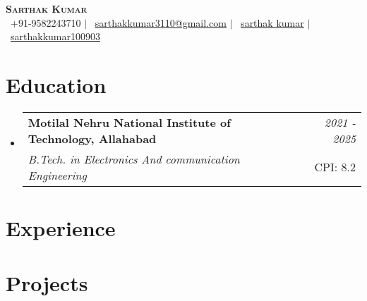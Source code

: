 \documentclass[a4paper,11pt]{article}
\makeatletter
\newcommand{\resumeSubheading}[4]{
\vspace{0mm}\item
    \begin{tabular*}{0.98\textwidth}[t]{l@{\extracolsep{\fill}}r}
        \textbf{#1} & \textit{\footnotesize{#4}} \\
        \textit{\footnotesize{#3}} &  \footnotesize{#2}\\
    \end{tabular*}
    \vspace{-2mm}
}
\newcommand{\resumeSubHeadingListStart}{\begin{itemize}[leftmargin=0ex, label={}, labelsep=0.0mm]}
\newcommand{\resumeSubHeadingListEnd}{\end{itemize}\vspace{0mm}}
\makeatother
\begin{document}
\selectfont


\begin{center}
    \textbf{\Huge \scshape Sarthak Kumar} \\ \vspace{-0.5pt}
    \small 
    \faPhone\ +91-9582243710 $|$ 
    \faEnvelope\ \href{mailto:sarthakkumar3110@gmail.com}{\underline{sarthakkumar3110@gmail.com}} $|$ 
    \faLinkedin\ \href{https://www.linkedin.com/in/sarthak-kumar311003/}{\underline{sarthak kumar}} $|$
    \faGithub\ \href{https://github.com/sarthakkumar100903}{\underline{sarthakkumar100903}}
\end{center}





\vspace{-3.0mm}
\section{\textbf{Education}}
\vspace{-0.5mm}
  \resumeSubHeadingListStart
    \resumeSubheading
      { Motilal Nehru National Institute of Technology, Allahabad}{CPI: 8.2}
      { B.Tech. in Electronics And communication Engineering}{2021 - 2025}
  \resumeSubHeadingListEnd
\vspace{-4.5mm}
\section{\textbf{Experience}}
\vspace{-0.5mm}
  
\vspace{-7.0mm}
\section{\textbf{Projects}}
\vspace{-1.0mm}
\resumeSubHeadingListStart



    \vspace{-3mm}  
  \resumeSubHeadingListEnd
\vspace{-2.55mm}






\vspace{-4.5mm} %
\end{document}
